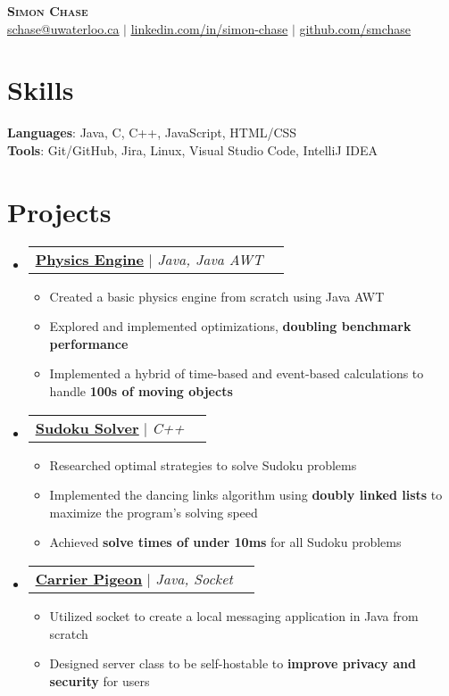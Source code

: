 \documentclass[letterpaper,11pt]{article}
\makeatletter
\newcommand{\resumeItem}[1]{
	\item\small{
		{#1 \vspace{-2pt}}
	}
}
\newcommand{\resumeProjectHeading}[2]{
    \item
    \begin{tabular*}{0.97\textwidth}{l@{\extracolsep{\fill}}r}
      \small#1 & #2 \\
    \end{tabular*}\vspace{-7pt}
}
\newcommand{\resumeSubHeadingListStart}{\begin{itemize}[leftmargin=0.15in, label={}]}
\newcommand{\resumeSubHeadingListEnd}{\end{itemize}}
\newcommand{\resumeItemListStart}{\begin{itemize}}
\newcommand{\resumeItemListEnd}{\end{itemize}\vspace{-5pt}}
\makeatother
\begin{document}
\begin{center}
    \textbf{\Huge \scshape Simon Chase} \\ \vspace{1pt}
    \small
	\href{mailto:schase@uwaterloo.ca}{\uline{schase@uwaterloo.ca}} $|$ 
    \href{https://linkedin.com/in/simon-chase}{\uline{linkedin.com/in/simon-chase}} $|$
    \href{https://github.com/smchase}{\uline{github.com/smchase}}
\end{center}


\section{Skills}
\begin{itemize}[leftmargin=0.15in, label={}]
\small{\item{
	\textbf{Languages}{: Java, C, C++, JavaScript, HTML/CSS} \\
	\textbf{Tools}{: Git/GitHub, Jira, Linux, Visual Studio Code, IntelliJ IDEA}
}}
\end{itemize}


\section{Projects}
\resumeSubHeadingListStart
	\resumeProjectHeading
	{\textbf{\href{https://github.com/Bro-Co/Physics-Engine}{\uline{Physics Engine}}} $|$ \textit{Java, Java AWT}}{} \resumeItemListStart
			\resumeItem{Created a basic physics engine from scratch using Java AWT}
			\resumeItem{Explored and implemented optimizations, \textbf{doubling benchmark performance}}
			\resumeItem{Implemented a hybrid of time-based and event-based calculations to handle \textbf{100s of moving objects}}
		\resumeItemListEnd
	\resumeProjectHeading
		{\textbf{\href{https://github.com/smchase/ICS201/tree/master/SUDOKU}{\uline{Sudoku Solver}}} $|$ \textit{C++}}{}
		\resumeItemListStart
			\resumeItem{Researched optimal strategies to solve Sudoku problems}
			\resumeItem{Implemented the dancing links algorithm using \textbf{doubly linked lists} to maximize the program's solving speed}
			\resumeItem{Achieved \textbf{solve times of under 10ms} for all Sudoku problems}
		\resumeItemListEnd
	\resumeProjectHeading
		{\textbf{\href{https://github.com/smchase/Carrier-Pigeon}{\uline{Carrier Pigeon}}} $|$ \textit{Java, Socket}}{}
		\resumeItemListStart
			\resumeItem{Utilized socket to create a local messaging application in Java from scratch}
			\resumeItem{Designed server class to be self-hostable to \textbf{improve privacy and security} for users}
		\resumeItemListEnd
\resumeSubHeadingListEnd
\end{document}

